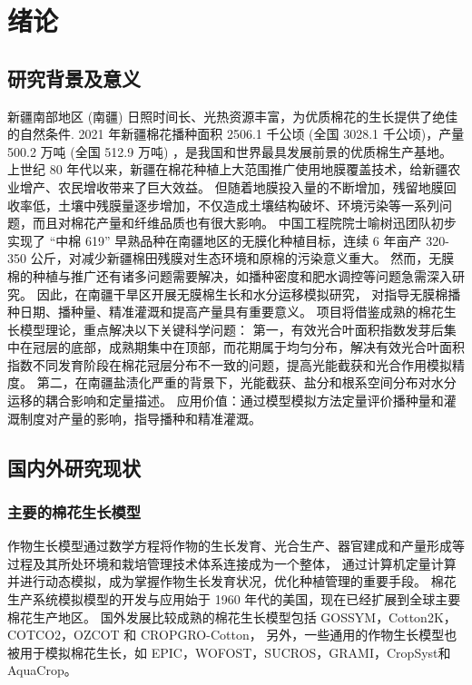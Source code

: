 \chapter{绪论}
\section{研究背景及意义}
新疆南部地区 (南疆) 日照时间长、光热资源丰富，为优质棉花的生长提供了绝佳的自然条件.
2021 年新疆棉花播种面积 2506.1 千公顷 (全国 3028.1 千公顷)，产量 500.2 万吨 (全国 512.9 万吨) \cite{国家统计局关于2021年棉花产量的公告}，是我国和世界最具发展前景的优质棉生产基地。
上世纪 80 年代以来，新疆在棉花种植上大范围推广使用地膜覆盖技术，给新疆农业增产、农民增收带来了巨大效益。
但随着地膜投入量的不断增加，残留地膜回收率低，土壤中残膜量逐步增加，不仅造成土壤结构破坏、环境污染等一系列问题，而且对棉花产量和纤维品质也有很大影响。
中国工程院院士喻树迅团队初步实现了 “中棉 619” 早熟品种在南疆地区的无膜化种植目标，连续 6 年亩产 320{-}350 公斤，对减少新疆棉田残膜对生态环境和原棉的污染意义重大\cite{yu2019}。
然而，无膜棉的种植与推广还有诸多问题需要解决，如播种密度和肥水调控等问题急需深入研究。
因此，在南疆干旱区开展无膜棉生长和水分运移模拟研究，
对指导无膜棉播种日期、播种量、精准灌溉和提高产量具有重要意义。
项目将借鉴成熟的棉花生长模型理论，重点解决以下关键科学问题：
第一，有效光合叶面积指数发芽后集中在冠层的底部，成熟期集中在顶部，而花期属于均匀分布，解决有效光合叶面积指数不同发育阶段在棉花冠层分布不一致的问题，提高光能截获和光合作用模拟精度。
第二，在南疆盐渍化严重的背景下，光能截获、盐分和根系空间分布对水分运移的耦合影响和定量描述。
应用价值：通过模型模拟方法定量评价播种量和灌溉制度对产量的影响，指导播种和精准灌溉。
\section{国内外研究现状}
\subsection{主要的棉花生长模型}
作物生长模型通过数学方程将作物的生长发育、光合生产、器官建成和产量形成等过程及其所处环境和栽培管理技术体系连接成为一个整体，
通过计算机定量计算并进行动态模拟，成为掌握作物生长发育状况，优化种植管理的重要手段。
棉花生产系统模拟模型的开发与应用始于 1960 年代的美国，现在已经扩展到全球主要棉花生产地区。
国外发展比较成熟的棉花生长模型包括 GOSSYM\cite{baker1976}，Cotton2K\cite{cotton2kv4}，COTCO2\cite{wall1994}，OZCOT\cite{hearn1994} 和 CROPGRO-Cotton\cite{jones2003}，
另外，一些通用的作物生长模型也被用于模拟棉花生长，如 EPIC\cite{williams1989}，WOFOST\cite{vanDiepen1989WOFOST}，SUCROS\cite{vanittersum2003}，GRAMI\cite{ko2005}，CropSyst\cite{sommer2008}和 AquaCrop\cite{steduto2009}。

